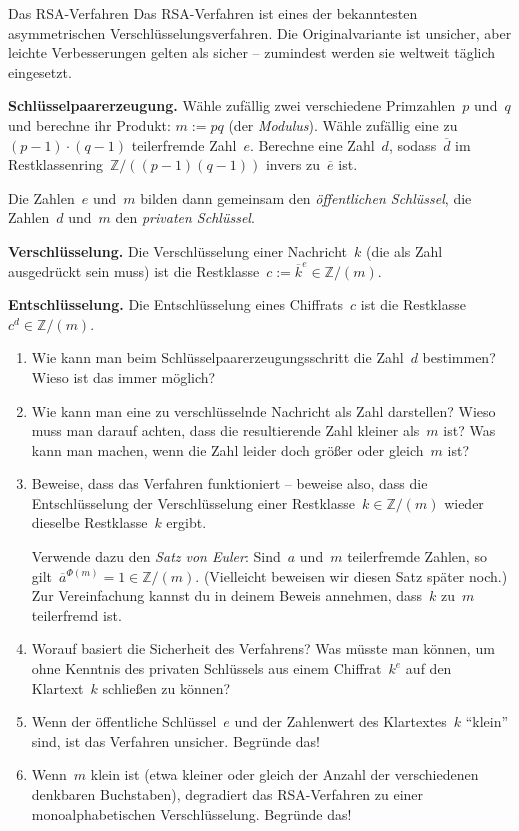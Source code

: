 \documentclass{zirkelblatt}
\newcommand{\ol}[1]{\ensuremath{\overline{#1}}}
\newcommand{\ZZ}{\mathbb{Z}}
\begin{document}
\begin{aufgabe}{Das RSA-Verfahren}
Das RSA-Verfahren ist eines der bekanntesten asymmetrischen
Verschlüsselungsverfahren. Die Originalvariante ist unsicher, aber leichte
Verbesserungen gelten als sicher -- zumindest werden sie weltweit täglich
eingesetzt.

\begin{shaded}
\textbf{Schlüsselpaarerzeugung.} Wähle zufällig zwei verschiedene Primzahlen~$p$ und~$q$ und
berechne ihr Produkt: $m := p q$ (der \emph{Modulus}). Wähle zufällig eine
zu~$(p-1) \cdot (q-1)$ teilerfremde Zahl~$e$. Berechne eine Zahl~$d$,
sodass~$\ol{d}$ im Restklassenring~$\ZZ/((p-1)(q-1))$ invers zu~$\ol{e}$ ist.

Die Zahlen~$e$ und~$m$ bilden dann gemeinsam den \emph{öffentlichen Schlüssel},
die Zahlen~$d$ und~$m$ den \emph{privaten Schlüssel}.

\textbf{Verschlüsselung.} Die Verschlüsselung einer Nachricht~$k$ (die als Zahl
ausgedrückt sein muss) ist die Restklasse~$c := \ol{k}^e \in \ZZ/(m)$.

\textbf{Entschlüsselung.} Die Entschlüsselung eines Chiffrats~$c$ ist die
Restklasse~$c^d \in \ZZ/(m)$.
\end{shaded}

\begin{enumerate}
\item Wie kann man beim Schlüsselpaarerzeugungsschritt die Zahl~$d$ bestimmen?
Wieso ist das immer möglich?
\item Wie kann man eine zu verschlüsselnde Nachricht als Zahl darstellen? Wieso
muss man darauf achten, dass die resultierende Zahl kleiner als~$m$ ist? Was
kann man machen, wenn die Zahl leider doch größer oder gleich~$m$ ist?
\item Beweise, dass das Verfahren funktioniert -- beweise also, dass die
Entschlüsselung der Verschlüsselung einer Restklasse~$k \in \ZZ/(m)$ wieder
dieselbe Restklasse~$k$ ergibt.

Verwende dazu den \emph{Satz von Euler}: Sind~$a$ und~$m$ teilerfremde Zahlen,
so gilt~$\ol{a}^{\Phi(m)} = 1 \in \ZZ/(m)$. (Vielleicht beweisen wir diesen
Satz später noch.) Zur Vereinfachung kannst du in deinem Beweis annehmen,
dass~$k$ zu~$m$ teilerfremd ist.
\item Worauf basiert die Sicherheit des Verfahrens? Was müsste man können, um
ohne Kenntnis des privaten Schlüssels aus einem Chiffrat~$k^e$ auf den
Klartext~$k$ schließen zu können?
\item Wenn der öffentliche Schlüssel~$e$ und der Zahlenwert des Klartextes~$k$
"`klein"' sind, ist das Verfahren unsicher. Begründe das!
\item Wenn~$m$ klein ist (etwa kleiner oder gleich der Anzahl der verschiedenen
denkbaren Buchstaben), degradiert das RSA-Verfahren zu einer monoalphabetischen
Verschlüsselung. Begründe das!
\end{enumerate}
\end{aufgabe}
\end{document}
